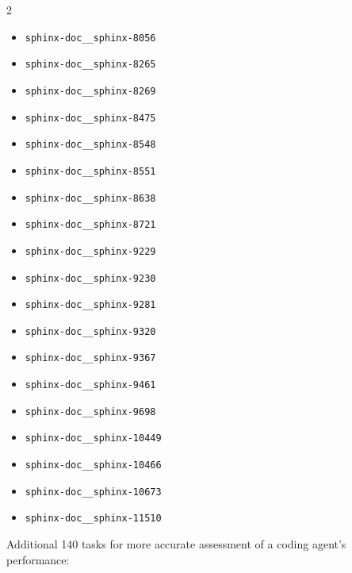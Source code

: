 \documentclass{article}
\begin{document}
\begin{multicols}{2}
\begin{itemize}
  \item \texttt{sphinx-doc\_\_sphinx-8056}
  \item \texttt{sphinx-doc\_\_sphinx-8265}
  \item \texttt{sphinx-doc\_\_sphinx-8269}
  \item \texttt{sphinx-doc\_\_sphinx-8475}
  \item \texttt{sphinx-doc\_\_sphinx-8548}
  \item \texttt{sphinx-doc\_\_sphinx-8551}
  \item \texttt{sphinx-doc\_\_sphinx-8638}
  \item \texttt{sphinx-doc\_\_sphinx-8721}
  \item \texttt{sphinx-doc\_\_sphinx-9229}
  \item \texttt{sphinx-doc\_\_sphinx-9230}
  \item \texttt{sphinx-doc\_\_sphinx-9281}
  \item \texttt{sphinx-doc\_\_sphinx-9320}
  \item \texttt{sphinx-doc\_\_sphinx-9367}
  \item \texttt{sphinx-doc\_\_sphinx-9461}
  \item \texttt{sphinx-doc\_\_sphinx-9698}
  \item \texttt{sphinx-doc\_\_sphinx-10449}
  \item \texttt{sphinx-doc\_\_sphinx-10466}
  \item \texttt{sphinx-doc\_\_sphinx-10673}
  \item \texttt{sphinx-doc\_\_sphinx-11510}
\end{itemize}
\end{multicols}


Additional 140 tasks for more accurate assessment of a coding agent's performance:
\end{document}
